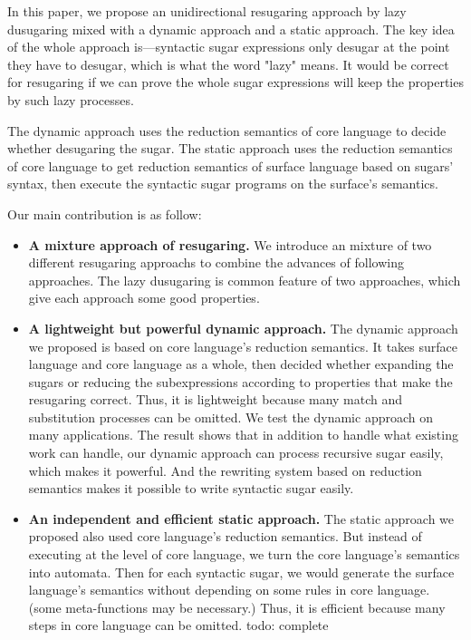 
In this paper, we propose an unidirectional resugaring approach by lazy dusugaring mixed with a dynamic approach and a static approach. The key idea of the whole approach is---syntactic sugar expressions only desugar at the point they have to desugar, which is what the word "lazy" means. It would be correct for resugaring if we can prove the whole sugar expressions will keep the properties by such lazy processes.

The dynamic approach uses the reduction semantics\cite{reduction} of core language to decide whether desugaring the sugar. The static approach uses the reduction semantics of core language to get reduction semantics of surface language based on sugars' syntax, then execute the syntactic sugar programs on the surface's semantics. 

Our main contribution is as follow:
\begin{itemize}
\item {\bfseries A mixture approach of resugaring.} We introduce an mixture of two different resugaring approachs to combine the advances of following approaches. The lazy dusugaring is common feature of two approaches, which give each approach some good properties.
\item {\bfseries A lightweight but powerful dynamic approach.} The dynamic approach we proposed is based on core language's reduction semantics. It takes surface language and core language as a whole, then decided whether expanding the sugars or reducing the subexpressions according to properties that make the resugaring correct. Thus, it is lightweight because many match and substitution processes can be omitted. We test the dynamic approach on many applications. The result shows that in addition to handle what existing work can handle, our dynamic approach can process recursive sugar easily, which makes it powerful. And the rewriting system based on reduction semantics makes it possible to write syntactic sugar easily.
\item {\bfseries An independent and efficient static approach.} The static approach we proposed also used core language's reduction semantics. But instead of executing at the level of core language, we turn the core language's semantics into automata. Then for each syntactic sugar, we would generate the surface language's semantics without depending on some rules in core language. (some meta-functions may be necessary.) Thus, it is efficient because many steps in core language can be omitted. todo: complete
\end{itemize}



